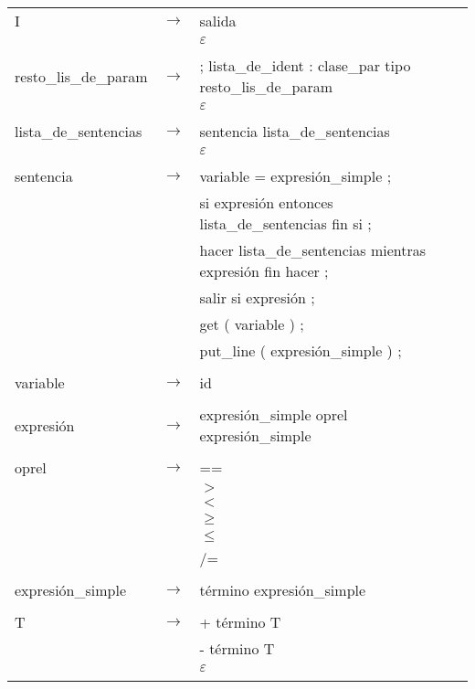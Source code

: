\documentclass[11pt,twoside,a4paper]{book}
\begin{document}
\begin{tabular}{l c l}
I & $ \rightarrow $ & salida \\
                  & &  $ \varepsilon $ \\
\\

resto\_lis\_de\_param & $ \rightarrow $ & ; lista\_de\_ident : clase\_par tipo resto\_lis\_de\_param \\
                  & &  $ \varepsilon $ \\
\\

lista\_de\_sentencias & $ \rightarrow $ & sentencia lista\_de\_sentencias \\
                  & &  $ \varepsilon $ \\
\\

sentencia & $ \rightarrow $ & variable = expresi\'{o}n\_simple ; \\
                  & & si expresi\'{o}n entonces lista\_de\_sentencias fin si ; \\
                  & & hacer lista\_de\_sentencias mientras expresi\'{o}n fin hacer ; \\
                  & & salir si expresi\'{o}n ; \\
                  & & get ( variable ) ; \\
                  & & put\_line ( expresi\'{o}n\_simple ) ; \\
\\

variable & $ \rightarrow $ & id \\
\\

expresi\'{o}n &  $ \rightarrow $  & expresi\'{o}n\_simple oprel expresi\'{o}n\_simple \\
\\

oprel &  $ \rightarrow $ & == \\
				  & & $ > $ \\
				  & & $ < $ \\
				  & & $ \geq $ \\ 
				  & & $ \leq $\\
				  & & /= \\
\\

expresi\'{o}n\_simple & $ \rightarrow $ & t\'{e}rmino expresi\'{o}n\_simple \\
\\

T &  $ \rightarrow $ & + t\'{e}rmino T \\
                  & & - t\'{e}rmino T \\
                  & &  $ \varepsilon $ \\
\\


\end{tabular}
\end{document}
